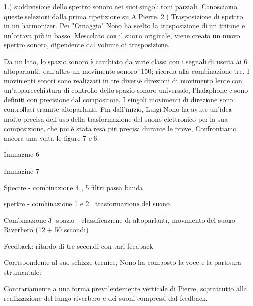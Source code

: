 1.) suddivisione dello spettro sonoro nei suoi singoli toni parziali. Conosciamo queste selezioni dalla prima ripetizione su A Pierre. 
2.) Trasposizione di spettro in un harmonizer. Per "Omaggio" Nono ha scelto la trasposizione di un tritone e un'ottava più in basso. Mescolato con il suono originale, viene creato un nuovo spettro sonoro, dipendente dal volume di trasposizione. 

Da un lato, lo spazio sonoro è cambiato da varie classi con i segnali di uscita ai 6 altoparlanti, dall'altro un movimento sonoro '150; ricorda alla combinazione tre. I movimenti sonori sono realizzati in tre diverse direzioni di movimento lente con un'apparecchiatura di controllo dello spazio sonoro universale, l'halaphone e sono definiti con precisione dal compositore. I singoli movimenti di direzione sono controllati tramite altoparlanti. 
Fin dall'inizio, Luigi Nono ha avuto un'idea molto precisa dell'uso della trasformazione del suono elettronico per la sua composizione, che poi è stata resa più precisa durante le prove, Confrontiamo ancora una volta le figure 7 e 6. 

Immagine 6 

Immagine 7 

Spectre - combinazione 4 , 5 filtri passa banda 

spettro - combinazione 1 e 2 , trasformazione del suono 

Combinazione 3- spazio - classificazione di altoparlanti, movimento del suono 
Riverbero (12 + 50 secondi) 

Feedback: ritardo di tre secondi con vari feedback 

Corrispondente al suo schizzo tecnico, Nono ha composto la voce e la partitura strumentale: 

Contrariamente a una forma prevalentemente verticale di Pierre, soprattutto alla realizzazione del lungo riverbero e dei suoni compressi dal feedback. 

